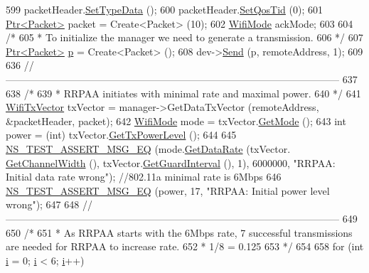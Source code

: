 \begin{DoxyCode}
599   packetHeader.\hyperlink{classns3_1_1WifiMacHeader_a8bc4915d867ea16df7c110a87c534c27}{SetTypeData} ();
600   packetHeader.\hyperlink{classns3_1_1WifiMacHeader_a84a98932f5b66cca86bdfaa9cb1bcf7b}{SetQosTid} (0);
601   \hyperlink{classns3_1_1Ptr}{Ptr<Packet>} packet = Create<Packet> (10);
602   \hyperlink{classns3_1_1WifiMode}{WifiMode} ackMode;
603 
604   \textcolor{comment}{/*}
605 \textcolor{comment}{   * To initialize the manager we need to generate a transmission.}
606 \textcolor{comment}{   */}
607   \hyperlink{classns3_1_1Ptr}{Ptr<Packet>} \hyperlink{lte__link__budget_8m_ac9de518908a968428863f829398a4e62}{p} = Create<Packet> ();
608   dev->\hyperlink{classns3_1_1WifiNetDevice_a14b6919a10da25e74e1c92554106b2c6}{Send} (p, remoteAddress, 1);
609 
636   \textcolor{comment}{//-----------------------------------------------------------------------------------------------------}
637 
638   \textcolor{comment}{/*}
639 \textcolor{comment}{   * RRPAA initiates with minimal rate and maximal power.}
640 \textcolor{comment}{   */}
641   \hyperlink{classns3_1_1WifiTxVector}{WifiTxVector} txVector = manager->GetDataTxVector (remoteAddress, &packetHeader, packet);
642   \hyperlink{classns3_1_1WifiMode}{WifiMode} mode = txVector.\hyperlink{classns3_1_1WifiTxVector_a497b1f11cad4b8b26251dfa07c9ad1d6}{GetMode} ();
643   \textcolor{keywordtype}{int} power = (int) txVector.\hyperlink{classns3_1_1WifiTxVector_a7c98bd9609ff1c5cefa6e22d6908a2fe}{GetTxPowerLevel} ();
644 
645   \hyperlink{group__testing_ga2a9d78cffb3db8e867c35fff0b698cf5}{NS\_TEST\_ASSERT\_MSG\_EQ} (mode.\hyperlink{classns3_1_1WifiMode_adcfbe150f69da720db23387f733b8a52}{GetDataRate} (txVector.
      \hyperlink{classns3_1_1WifiTxVector_a1f8bfa51778a3e217581eb665f059564}{GetChannelWidth} (), txVector.\hyperlink{classns3_1_1WifiTxVector_ab80c0fd812542ef337a6cace4f64db63}{GetGuardInterval} (), 1), 6000000, \textcolor{stringliteral}{"RRPAA:
       Initial data rate wrong"}); \textcolor{comment}{//802.11a minimal rate is 6Mbps}
646   \hyperlink{group__testing_ga2a9d78cffb3db8e867c35fff0b698cf5}{NS\_TEST\_ASSERT\_MSG\_EQ} (power, 17, \textcolor{stringliteral}{"RRPAA: Initial power level wrong"});
647 
648   \textcolor{comment}{//-----------------------------------------------------------------------------------------------------}
649 
650   \textcolor{comment}{/*}
651 \textcolor{comment}{   * As RRPAA starts with the 6Mbps rate, 7 successful transmissions are needed for RRPAA to increase rate.}
652 \textcolor{comment}{   * 1/8 = 0.125}
653 \textcolor{comment}{   */}
654 
658   \textcolor{keywordflow}{for} (\textcolor{keywordtype}{int} \hyperlink{bernuolliDistribution_8m_a6f6ccfcf58b31cb6412107d9d5281426}{i} = 0; \hyperlink{bernuolliDistribution_8m_a6f6ccfcf58b31cb6412107d9d5281426}{i} < 6; \hyperlink{bernuolliDistribution_8m_a6f6ccfcf58b31cb6412107d9d5281426}{i}++)

\end{DoxyCode}
